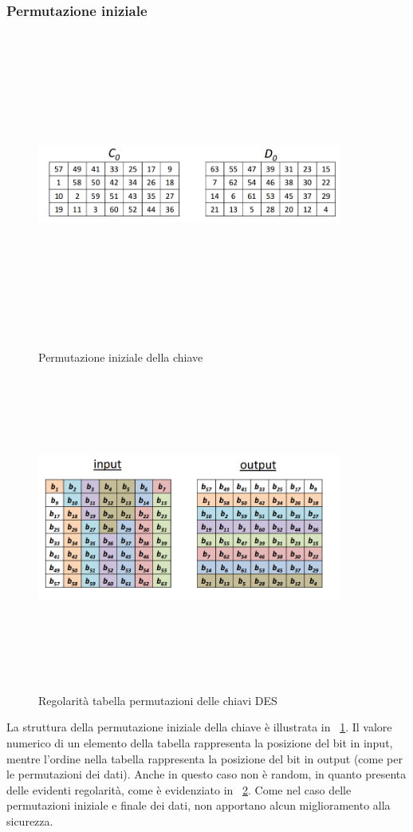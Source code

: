 \subsubsection{Permutazione iniziale}
\begin{figure}[htbp]
	\centering%
	\subfigure%
	{\includegraphics[height=10cm, width=10cm, keepaspectratio]{Immagini/chiave_segreta/des_perm_keys.png}}
	\caption{Permutazione iniziale della chiave \label{fig:des_perm_keys}} 	
\end{figure}
\begin{figure}[htbp]
	\centering%
	\subfigure%
	{\includegraphics[height=10cm, width=10cm, keepaspectratio]{Immagini/chiave_segreta/des_perm_keys_2.png}}
	\caption{Regolarità tabella permutazioni delle chiavi DES \label{fig:des_perm_keys_2}} 	
\end{figure}
La struttura della permutazione iniziale della chiave è illustrata in \figurename ~\ref{fig:des_perm_keys}. Il valore numerico di un elemento della tabella rappresenta la posizione del bit in input, mentre l'ordine nella tabella rappresenta la posizione del bit in output (come per le permutazioni dei dati). Anche in questo caso non è random, in quanto presenta delle evidenti regolarità, come è evidenziato in \figurename ~\ref{fig:des_perm_keys_2}. Come nel caso delle permutazioni iniziale e finale dei dati, non apportano alcun miglioramento alla sicurezza.

